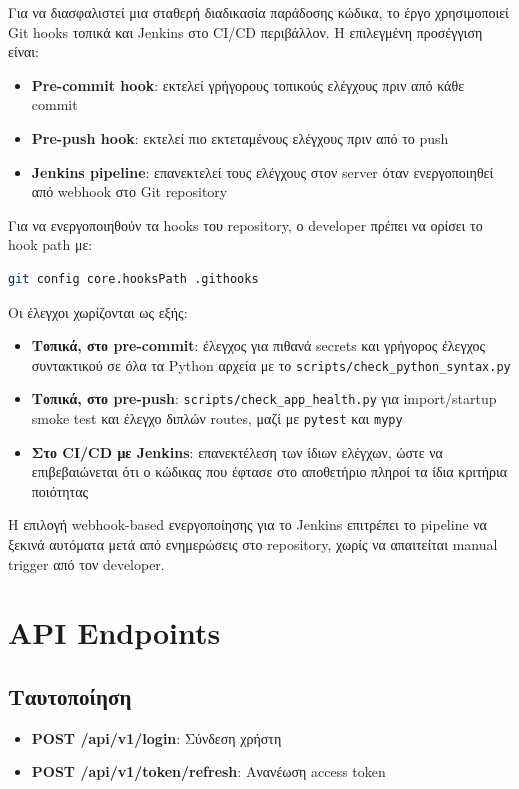 \documentclass[12pt,a4paper]{report}
\begin{document}
Για να διασφαλιστεί μια σταθερή διαδικασία παράδοσης κώδικα, το έργο χρησιμοποιεί Git hooks τοπικά και Jenkins στο CI/CD περιβάλλον. Η επιλεγμένη προσέγγιση είναι:
\begin{itemize}
    \item \textbf{Pre-commit hook}: εκτελεί γρήγορους τοπικούς ελέγχους πριν από κάθε commit
    \item \textbf{Pre-push hook}: εκτελεί πιο εκτεταμένους ελέγχους πριν από το push
    \item \textbf{Jenkins pipeline}: επανεκτελεί τους ελέγχους στον server όταν ενεργοποιηθεί από webhook στο Git repository
\end{itemize}

Για να ενεργοποιηθούν τα hooks του repository, ο developer πρέπει να ορίσει το hook path με:
\begin{lstlisting}[language=bash]
git config core.hooksPath .githooks
\end{lstlisting}

Οι έλεγχοι χωρίζονται ως εξής:
\begin{itemize}
    \item \textbf{Τοπικά, στο pre-commit}: έλεγχος για πιθανά secrets και γρήγορος έλεγχος συντακτικού σε όλα τα Python αρχεία με το \texttt{scripts/check_python_syntax.py}
    \item \textbf{Τοπικά, στο pre-push}: \texttt{scripts/check_app_health.py} για import/startup smoke test και έλεγχο διπλών routes, μαζί με \texttt{pytest} και \texttt{mypy}
    \item \textbf{Στο CI/CD με Jenkins}: επανεκτέλεση των ίδιων ελέγχων, ώστε να επιβεβαιώνεται ότι ο κώδικας που έφτασε στο αποθετήριο πληροί τα ίδια κριτήρια ποιότητας
\end{itemize}

Η επιλογή webhook-based ενεργοποίησης για το Jenkins επιτρέπει το pipeline να ξεκινά αυτόματα μετά από ενημερώσεις στο repository, χωρίς να απαιτείται manual trigger από τον developer.

\section{API Endpoints}

\subsection{Ταυτοποίηση}

\begin{itemize}
    \item \textbf{POST /api/v1/login}: Σύνδεση χρήστη
    \item \textbf{POST /api/v1/token/refresh}: Ανανέωση access token
\end{itemize}
\end{document}

